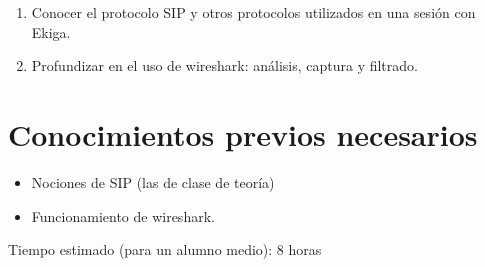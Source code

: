 \documentclass[11pt,a4paper]{article}
\begin{document}
\begin{enumerate}
  \item Conocer el protocolo SIP y otros protocolos utilizados en una sesión con Ekiga.
  \item Profundizar en el uso de wireshark: análisis, captura y filtrado.
\end{enumerate}

\section{Conocimientos previos necesarios}

\begin{itemize}
  \item Nociones de SIP (las de clase de teoría)
  \item Funcionamiento de wireshark.
\end{itemize}

Tiempo estimado (para un alumno medio): 8 horas
\end{document}
